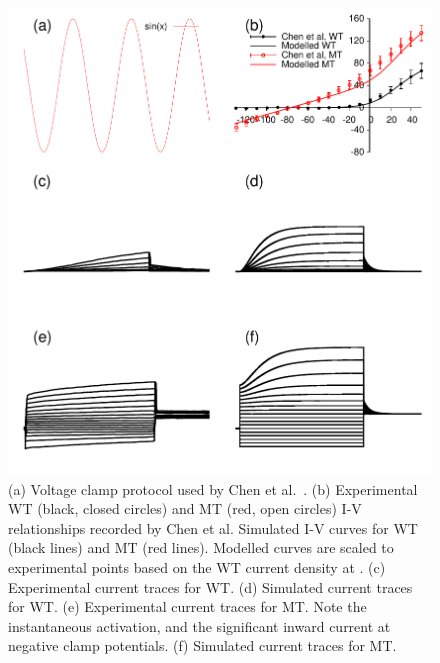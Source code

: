 \begin{figure}
\includegraphics{figures/atrium/iks/figures/01_IV}
\caption[KCNQ1 mutation in IKs, experimental data]{
\label{atrium:iks:vc}
(a) Voltage clamp protocol used by Chen et al.~\cite{Chen2003}.
(b) Experimental WT (black, closed circles) and MT (red, open circles)
I-V relationships recorded by Chen et al.  Simulated I-V curves for WT (black
lines) and MT (red lines).  Modelled curves are scaled to experimental points
based on the WT current density at .
(c) Experimental current traces for WT.
(d) Simulated current traces for WT.
(e) Experimental current traces for MT.  Note the instantaneous
activation, and the significant inward current at negative clamp potentials.
(f) Simulated current traces for MT.
}
\end{figure}

